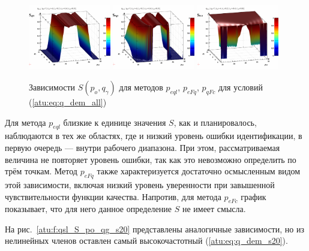\begin{figure}[htb!]
  \centerline{
    \includegraphics[width=0.32\textwidth]{p/qls_pe-p_po_qg_Sql_all.png}
    \hfill
    \includegraphics[width=0.32\textwidth]{p/qls_pe-p_po_qg_SFq_all.png}
    \hfill
    \includegraphics[width=0.32\textwidth]{p/qls_pe-p_po_qg_SFc_all.png}
  }
  \caption{Зависимости $S(p_o,q_\gamma)$ для методов $p_{eql}$, $p_{eFq}$, $p_{qFc}$ для условий (\ref{atu:eq:q_dem_all})}
  \label{atu:f:qsl_S_po_qg_all}
\end{figure}

Для метода $p_{eql}$ близкие к единице значения $S$, как и планировалось,
наблюдаются в тех же областях, где и низкий уровень ошибки идентификации,
в первую очередь --- внутри рабочего диапазона. При этом,
рассматриваемая величина не повторяет уровень ошибки, так как
это невозможно определить по трём точкам. Метод
$p_{eFq}$ также характеризуется достаточно осмысленным видом этой зависимости,
включая низкий уровень уверенности при завышенной чувствительности функции качества.
Напротив, для метода $p_{eFc}$ график показывает, что для него
данное определение $S$ не имеет смысла.


На рис.~\ref{atu:f:qsl_S_po_qg_s20} представлены аналогичные зависимости,
но из нелинейных членов оставлен самый высокочастотный (\ref{atu:eq:q_dem_s20}).

